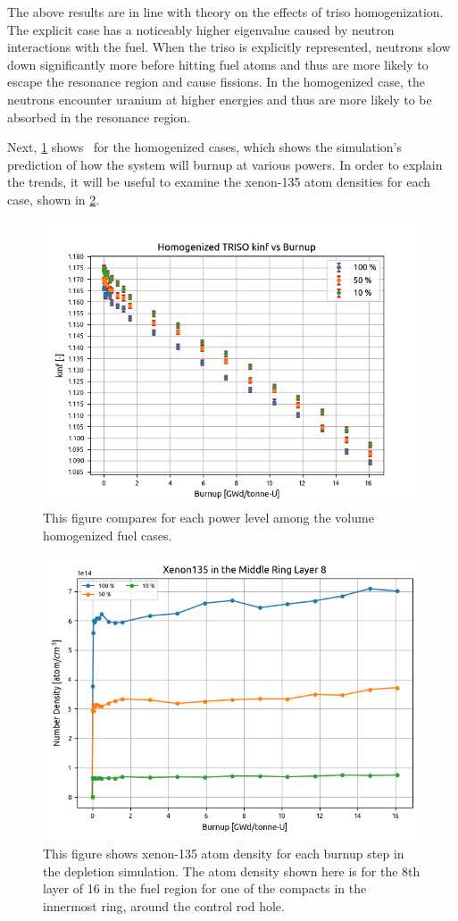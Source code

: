\documentclass[letterpaper]{physor2024}
\begin{document}
The above results are in line with theory on the effects of \gls{triso} homogenization. The explicit case has a noticeably higher eigenvalue caused by neutron interactions with the fuel. When the \gls{triso} is explicitly represented, neutrons slow down significantly more before hitting fuel atoms and thus are more likely to escape the resonance region and cause fissions. In the homogenized case, the neutrons encounter uranium at higher energies and thus are more likely to be absorbed in the resonance region.

Next, \cref{fig:all_powers_kinf_vs_burnup} shows \kinf~for the homogenized cases, which shows the simulation's prediction of how the system will burnup at various powers. In order to explain the trends, it will be useful to examine the xenon-135 atom densities for each case, shown in \cref{fig:homog_xenons}.
\vspace*{-0.45cm}
\begin{figure}[!h]
    \centering
    \includegraphics[width=0.65\linewidth]{figures/all_homog_burnup_as_function_of_keff.png}
    \caption{This figure compares \kinf for each power level among the volume homogenized fuel cases.}
    \label{fig:all_powers_kinf_vs_burnup}
\end{figure}
\vspace*{-0.7cm}
\begin{figure}[!h]
    \centering
    \includegraphics[width=0.6\linewidth]{figures/mid_compact_layer_8_Xe135.png}
    \caption{This figure shows xenon-135 atom density for each burnup step in the depletion simulation. The atom density shown here is for the 8th layer of 16 in the fuel region for one of the compacts in the innermost ring, around the control rod hole. }
    \label{fig:homog_xenons}
\end{figure}
\end{document}
